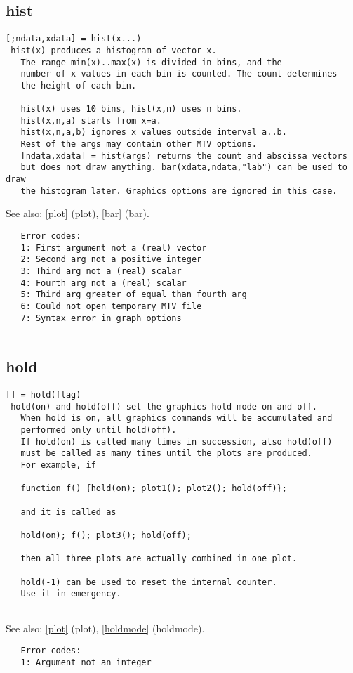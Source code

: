 \documentclass[a4paper]{article}
\begin{document}
\subsection{hist\label{hist}}

\begin{tscreen}
\begin{verbatim}
[;ndata,xdata] = hist(x...)
 hist(x) produces a histogram of vector x.
   The range min(x)..max(x) is divided in bins, and the
   number of x values in each bin is counted. The count determines
   the height of each bin.
   
   hist(x) uses 10 bins, hist(x,n) uses n bins.
   hist(x,n,a) starts from x=a.
   hist(x,n,a,b) ignores x values outside interval a..b.
   Rest of the args may contain other MTV options.
   [ndata,xdata] = hist(args) returns the count and abscissa vectors
   but does not draw anything. bar(xdata,ndata,"lab") can be used to draw
   the histogram later. Graphics options are ignored in this case.
\end{verbatim}

See also: \ref{plot} {(plot)}, \ref{bar} {(bar)}.
\begin{verbatim}
   Error codes:
   1: First argument not a (real) vector
   2: Second arg not a positive integer
   3: Third arg not a (real) scalar
   4: Fourth arg not a (real) scalar
   5: Third arg greater of equal than fourth arg
   6: Could not open temporary MTV file
   7: Syntax error in graph options
   
\end{verbatim}
\end{tscreen}



\subsection{hold\label{hold}}

\begin{tscreen}
\begin{verbatim}
[] = hold(flag)
 hold(on) and hold(off) set the graphics hold mode on and off.
   When hold is on, all graphics commands will be accumulated and
   performed only until hold(off).
   If hold(on) is called many times in succession, also hold(off)
   must be called as many times until the plots are produced.
   For example, if

   function f() {hold(on); plot1(); plot2(); hold(off)};

   and it is called as

   hold(on); f(); plot3(); hold(off);

   then all three plots are actually combined in one plot.

   hold(-1) can be used to reset the internal counter.
   Use it in emergency.
   
\end{verbatim}

See also: \ref{plot} {(plot)}, \ref{holdmode} {(holdmode)}.
\begin{verbatim}
   Error codes:
   1: Argument not an integer 
\end{verbatim}
\end{tscreen}
\end{document}
